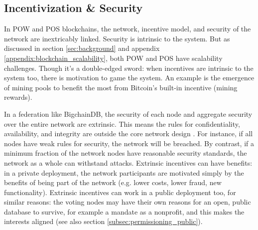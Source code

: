 \subsection{Incentivization \& Security}
In POW and POS blockchains, the network, incentive model, and security of the network are inextricably linked. Security is intrinsic to the system.
But as discussed in section \ref{sec:background} and appendix \ref{appendix:blockchain_scalability}, both POW and POS have scalability challenges.
Though it’s a double-edged sword: when incentives are intrinsic to the system too, there is motivation to game the system.
An example is the emergence of mining pools to benefit the most from Bitcoin’s built-in incentive (mining rewards).

In a federation like BigchainDB, the security of each node and aggregate security over the entire network are extrinsic.
This means the rules for confidentiality, availability, and integrity are outside the core network design \cite{gault2015cia_secret}.
For instance, if all nodes have weak rules for security, the network will be breached.
By contrast, if a minimum fraction of the network nodes have reasonable security standards, the network as a whole can withstand attacks.
Extrinsic incentives can have benefits: in a private deployment, the network participants are motivated simply by the benefits of being part of the network (e.g. lower costs, lower fraud, new functionality).
Extrinsic incentives can work in a public deployment too, for similar reasons: the voting nodes may have their own reasons for an open, public database to survive, for example a mandate as a nonprofit, and this makes the interests aligned (see also section \ref{subsec:permissioning_public}).